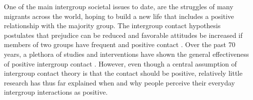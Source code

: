 \documentclass[man, 12pt, a4paper, mask]{apa7}
\theoremstyle{break}
\theoremstyle{plain}
\begin{document}
%
%
%

One of the main intergroup societal issues to date, are the struggles of many migrants across the world, hoping to build a new life that includes a positive relationship with the majority group. The intergroup contact hypothesis postulates that prejudice can be reduced and favorable attitudes be increased if members of two groups have frequent and positive contact \citep[e.g.,][]{Allport1954b, Hewstone1996, Pettigrew1998}. Over the past 70 years, a plethora of studies and interventions have shown the general effectiveness of positive intergroup contact \citep[e.g.,][]{Pettigrew2006}. However, even though a central assumption of intergroup contact theory is that the contact should be positive, relatively little research has thus far explained when and why people perceive their everyday intergroup interactions as positive. 
\end{document}
